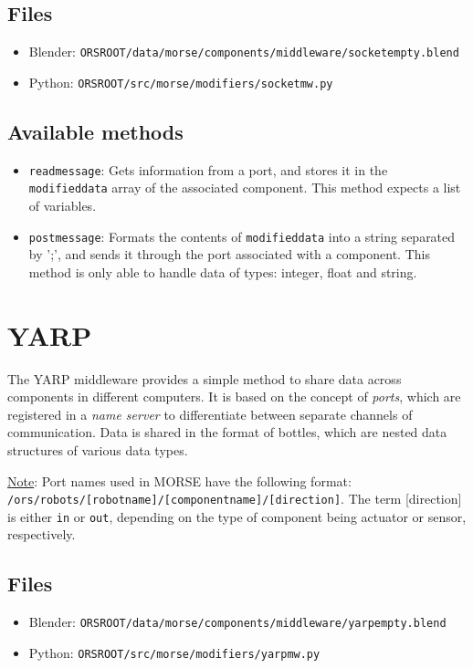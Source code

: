 \documentclass[twoside,a4paper,10pt]{report}
\newcommand{\dokutitlelevelone}[1]{\chapter{#1}}
\newcommand{\dokutitleleveltwo}[1]{\section{#1}}
\newcommand{\dokuitalic}[1]{\textsl{#1}}
\newcommand{\dokumonospace}[1]{\texttt{#1}}
\newcommand{\dokuunderline}[1]{\underline{#1}}
\newcommand{\dokuitem}{\item}
\begin{document}
\dokutitleleveltwo{Files}
\label{45b963397aa40d4a0063e0d85e4fe7a1}%

\begin{itemize}
\dokuitem  Blender: \dokumonospace{{\textdollar}ORS{\textunderscore}ROOT/data/morse/components/middleware/socket{\textunderscore}empty.blend}
\dokuitem  Python: \dokumonospace{{\textdollar}ORS{\textunderscore}ROOT/src/morse/modifiers/socket{\textunderscore}mw.py}
\end{itemize}

\dokutitleleveltwo{Available methods}
\label{a2d06dcb42bbd0519b19166fd7f36cea}%

\begin{itemize}
\dokuitem  \dokumonospace{read{\textunderscore}message}: Gets information from a port, and stores it in the \dokumonospace{modified{\textunderscore}data} array of the associated component. This method expects a list of variables.
\dokuitem  \dokumonospace{post{\textunderscore}message}: Formats the contents of \dokumonospace{modified{\textunderscore}data} into a string separated by ';', and sends it through the port associated with a component. This method is only able to handle data of types: integer, float and string.
\end{itemize}

\dokutitlelevelone{YARP}
\label{ec46d0b85077d7a7fe8da2e2b4c70462}%
\label{ec46d0b85077d7a7fe8da2e2b4c70462}%
The YARP middleware provides a simple method to share data across components in different computers. It is based on the concept of \dokuitalic{ports}, which are registered in a \dokuitalic{name server} to differentiate between separate channels of communication.
Data is shared in the format of bottles, which are nested data structures of various data types.

\dokuunderline{Note}: Port names used in MORSE have the following format:\\ \dokumonospace{/ors/robots/[robot{\textunderscore}name]/[component{\textunderscore}name]/[direction]}. The term [direction] is either \dokumonospace{in} or \dokumonospace{out}, depending on the type of component being actuator or sensor, respectively.


\dokutitleleveltwo{Files}
\label{45b963397aa40d4a0063e0d85e4fe7a1}%

\begin{itemize}
\dokuitem  Blender: \dokumonospace{{\textdollar}ORS{\textunderscore}ROOT/data/morse/components/middleware/yarp{\textunderscore}empty.blend}
\dokuitem  Python: \dokumonospace{{\textdollar}ORS{\textunderscore}ROOT/src/morse/modifiers/yarp{\textunderscore}mw.py}
\end{itemize}
\end{document}
